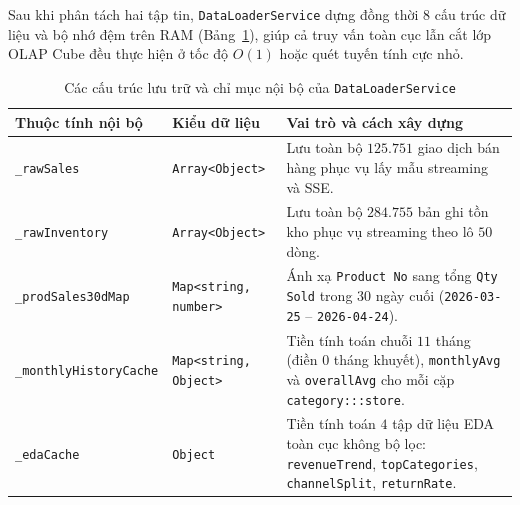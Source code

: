 Sau khi phân tách hai tập tin, \texttt{DataLoaderService} dựng đồng thời $8$ cấu trúc dữ liệu và bộ nhớ đệm trên RAM (Bảng~\ref{tab:ram-structures}), giúp cả truy vấn toàn cục lẫn cắt lớp OLAP Cube đều thực hiện ở tốc độ $O(1)$ hoặc quét tuyến tính cực nhỏ.

\begin{table}[H]
	\centering
	\caption{Các cấu trúc lưu trữ và chỉ mục nội bộ của \texttt{DataLoaderService}}
	\label{tab:ram-structures}
	\footnotesize
	\setlength{\tabcolsep}{4pt}
	\begin{tabular}{p{4.5cm} p{3.5cm} p{7.7cm}}
		\toprule
		\textbf{Thuộc tính nội bộ}                                           & \textbf{Kiểu dữ liệu}                  & \textbf{Vai trò và cách xây dựng}                                                                                                                                                            \\
		\midrule
		\texttt{_rawSales}                                         & \texttt{Array<Object>}       & Lưu toàn bộ $125.751$ giao dịch bán hàng phục vụ lấy mẫu streaming và SSE.                                                                                                                   \\
		\texttt{_rawInventory}                                     & \texttt{Array<Object>}       & Lưu toàn bộ $284.755$ bản ghi tồn kho phục vụ streaming theo lô $50$ dòng.                                                                                                                   \\
		\texttt{_prodSales30dMap}                                  & \texttt{Map<string, number>} & Ánh xạ \texttt{Product No} sang tổng \texttt{Qty Sold} trong $30$ ngày cuối (\texttt{2026-03-25} -- \texttt{2026-04-24}).                                                \\
		\texttt{_monthlyHistoryCache}                              & \texttt{Map<string, Object>} & Tiền tính toán chuỗi $11$ tháng (điền $0$ tháng khuyết), \texttt{monthlyAvg} và \texttt{overallAvg} cho mỗi cặp \texttt{category:::store}.                     \\
		\texttt{_edaCache}                                         & \texttt{Object}              & Tiền tính toán $4$ tập dữ liệu EDA toàn cục không bộ lọc: \texttt{revenueTrend}, \texttt{topCategories}, \texttt{channelSplit}, \texttt{returnRate}. \\

\end{tabular}
\end{table}
